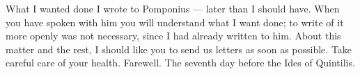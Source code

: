 

What I wanted done I wrote to Pomponius --- later than I should have. When you have spoken with him you will understand what I want done; to write of it more openly was not necessary, since I had already written to him. About this matter and the rest, I should like you to send us letters as soon as possible. Take careful care of your health. Farewell. The seventh day before the Ides of Quintilis.
